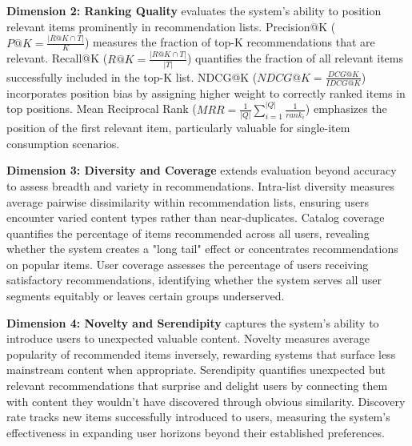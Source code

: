 \textbf{Dimension 2: Ranking Quality} evaluates the system's ability to position relevant items prominently in recommendation lists. Precision@K ($P@K = \frac{|R@K \cap T|}{K}$) measures the fraction of top-K recommendations that are relevant. Recall@K ($R@K = \frac{|R@K \cap T|}{|T|}$) quantifies the fraction of all relevant items successfully included in the top-K list. NDCG@K ($NDCG@K = \frac{DCG@K}{IDCG@K}$) incorporates position bias by assigning higher weight to correctly ranked items in top positions. Mean Reciprocal Rank ($MRR = \frac{1}{|Q|}\sum_{i=1}^{|Q|}\frac{1}{rank_i}$) emphasizes the position of the first relevant item, particularly valuable for single-item consumption scenarios.

\textbf{Dimension 3: Diversity and Coverage} extends evaluation beyond accuracy to assess breadth and variety in recommendations. Intra-list diversity measures average pairwise dissimilarity within recommendation lists, ensuring users encounter varied content types rather than near-duplicates. Catalog coverage quantifies the percentage of items recommended across all users, revealing whether the system creates a "long tail" effect or concentrates recommendations on popular items. User coverage assesses the percentage of users receiving satisfactory recommendations, identifying whether the system serves all user segments equitably or leaves certain groups underserved.

\textbf{Dimension 4: Novelty and Serendipity} captures the system's ability to introduce users to unexpected valuable content. Novelty measures average popularity of recommended items inversely, rewarding systems that surface less mainstream content when appropriate. Serendipity quantifies unexpected but relevant recommendations that surprise and delight users by connecting them with content they wouldn't have discovered through obvious similarity. Discovery rate tracks new items successfully introduced to users, measuring the system's effectiveness in expanding user horizons beyond their established preferences.


